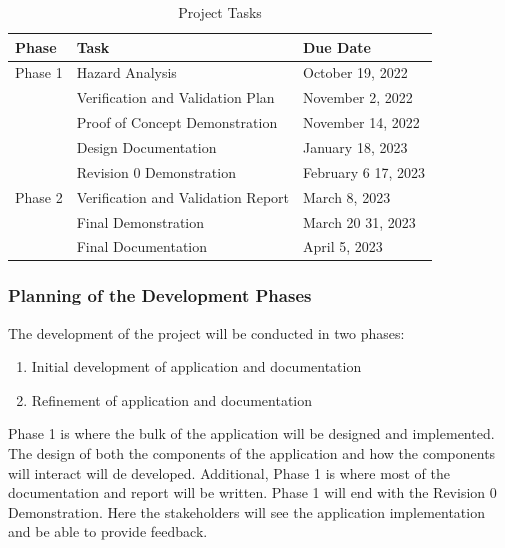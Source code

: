 \documentclass[12pt]{article}
\begin{document}
\begin{table}[H]
	\centering
	\caption{Project Tasks}
	\vspace{5pt}
	\begin{tabular}{|p{}|p{}|p{}|}
		\hline
		\textbf{Phase} & \textbf{Task}                      & \textbf{Due Date}                 \\
		\hline
		Phase 1        & Hazard Analysis                    & October 19, 2022                  \\
		\cline{2-3}    & Verification and Validation Plan   & November 2, 2022                  \\
		\cline{2-3}    & Proof of Concept Demonstration     & November 14, 2022                 \\
		\cline{2-3}    & Design Documentation               & January 18, 2023                  \\
		\cline{2-3}    & Revision 0 Demonstration           & February 6 \textemdash{} 17, 2023 \\
		\hline
		Phase 2        & Verification and Validation Report & March 8, 2023                     \\
		\cline{2-3}    & Final Demonstration                & March 20 \textemdash{} 31, 2023   \\
		\cline{2-3}    & Final Documentation                & April 5, 2023                     \\
		\hline
	\end{tabular}

	\label{project_tasks}
\end{table}

\subsubsection{Planning of the Development Phases}

The development of the project will be conducted in two phases:

\begin{enumerate}
	\item Initial development of application and documentation
	\item Refinement of application and documentation
\end{enumerate}

Phase 1 is where the bulk of the application will be designed and implemented. The design of both
the components of the application and how the components will interact will de developed.
Additional, Phase 1 is where most of the documentation and report will be written. Phase 1 will end
with the Revision 0 Demonstration. Here the stakeholders will see the application implementation
and be able to provide feedback.
\end{document}
